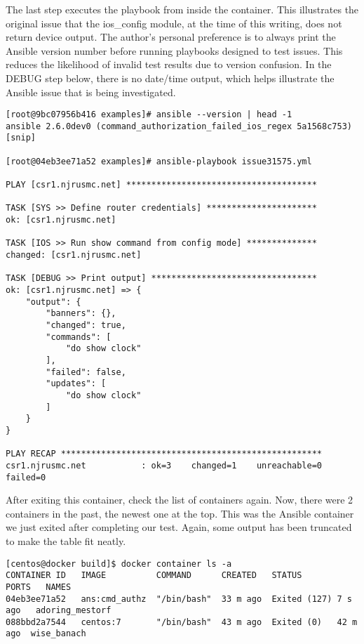 The last step executes the playbook from inside the container. This
illustrates the original issue that the ios\_config module, at the time of this
writing, does not return device output. The author's personal preference is to
always print the Ansible version number before running playbooks designed to
test issues. This reduces the likelihood of invalid test results due to
version confusion. In the DEBUG step below, there is no date/time output,
which helps illustrate the Ansible issue that is being investigated.

\begin{verbatim}
[root@9bc07956b416 examples]# ansible --version | head -1
ansible 2.6.0dev0 (command_authorization_failed_ios_regex 5a1568c753) [snip]

[root@04eb3ee71a52 examples]# ansible-playbook issue31575.yml 

PLAY [csr1.njrusmc.net] **************************************

TASK [SYS >> Define router credentials] **********************
ok: [csr1.njrusmc.net]

TASK [IOS >> Run show command from config mode] **************
changed: [csr1.njrusmc.net]

TASK [DEBUG >> Print output] *********************************
ok: [csr1.njrusmc.net] => {
    "output": {
        "banners": {}, 
        "changed": true, 
        "commands": [
            "do show clock"
        ], 
        "failed": false, 
        "updates": [
            "do show clock"
        ]
    }
}

PLAY RECAP ****************************************************
csr1.njrusmc.net           : ok=3    changed=1    unreachable=0    failed=0   
\end{verbatim}

After exiting this container, check the list of containers again. Now, there
were 2 containers in the past, the newest one at the top. This was the Ansible
container we just exited after completing our test. Again, some output has
been truncated to make the table fit neatly.

\begin{verbatim}
[centos@docker build]$ docker container ls -a
CONTAINER ID   IMAGE          COMMAND      CREATED   STATUS         PORTS   NAMES
04eb3ee71a52   ans:cmd_authz  "/bin/bash"  33 m ago  Exited (127) 7 s ago   adoring_mestorf
088bbd2a7544   centos:7       "/bin/bash"  43 m ago  Exited (0)   42 m ago  wise_banach
\end{verbatim}

